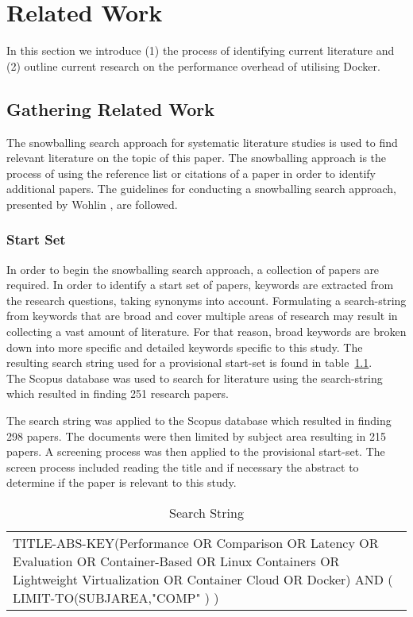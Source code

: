 \iffalse  \fi
\chapter{Related Work}
In this section we introduce (1) the process of identifying current literature and (2) outline current research on the performance overhead of utilising Docker.

\section{Gathering Related Work}
The snowballing search approach for systematic literature studies is used to find relevant literature on the topic of this paper. The snowballing approach is the process of using the reference list or citations of a paper in order to identify additional papers. The guidelines for conducting a snowballing search approach, presented by Wohlin \cite{Wohlin}, are followed. 

\subsection{Start Set}
In order to begin the snowballing search approach, a collection of papers are required. In order to identify a start set of papers, keywords are extracted from the research questions, taking synonyms into account. Formulating a search-string from keywords that are broad and cover multiple areas of research may result in collecting a vast amount of literature. For that reason, broad keywords are broken down into more specific and detailed keywords specific to this study. The resulting search string used for a provisional start-set is found in table~\ref{search-string}. \\

The Scopus \cite{scopus} database was used to search for literature using the search-string which resulted in finding 251 research papers. 

The search string was applied to the Scopus \cite{scopus} database which resulted in finding 298 papers. The documents were then limited by subject area resulting in 215 papers. A screening process was then applied to the provisional start-set. The screen process included reading the title and if necessary the abstract to determine if the paper is relevant to this study. 

\begin{table}[]
\centering
\begin{tabular}{p{15cm}}
TITLE-ABS-KEY(Performance OR Comparison OR Latency OR Evaluation OR Container-Based OR Linux Containers OR Lightweight Virtualization OR Container Cloud OR Docker) AND ( LIMIT-TO(SUBJAREA,"COMP" ) )
\end{tabular}
\caption{Search String}
\label{search-string}
\end{table}



